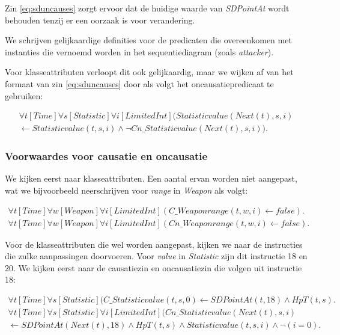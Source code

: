 Zin \ref{eq:sduncauses} zorgt ervoor dat de huidige waarde van \textit{SDPointAt} wordt behouden tenzij er een oorzaak is voor verandering.

We schrijven gelijkaardige definities voor de predicaten die overeenkomen met instanties die vernoemd worden in het sequentiediagram (zoals \textit{attacker}).

\parbreak

Voor klasseattributen verloopt dit ook gelijkaardig, maar we wijken af van het formaat van zin \ref{eq:sduncauses} door als volgt het oncausatiepredicaat te gebruiken:

\begin{align*}
	\forall{t}[Time]\forall{s}[Statistic]\forall{i}[LimitedInt](Statisticvalue(Next(t), s, i) \\ \leftarrow Statisticvalue(t, s, i) \land \lnot Cn\_Statisticvalue(Next(t), s, i)).
\end{align*}

\subsubsection{Voorwaardes voor causatie en oncausatie}
We kijken eerst naar klasseattributen. Een aantal ervan worden niet aangepast, wat we bijvoorbeeld neerschrijven voor \textit{range} in \textit{Weapon} als volgt:

\begin{align*}
	\forall{t}[Time]\forall{w}[Weapon]\forall{i}[LimitedInt](C\_Weaponrange(t, w, i) \leftarrow false).
\end{align*}
\begin{align*}
	\forall{t}[Time]\forall{w}[Weapon]\forall{i}[LimitedInt](Cn\_Weaponrange(t, w, i) \leftarrow false).
\end{align*}

Voor de klasseattributen die wel worden aangepast, kijken we naar de instructies die zulke aanpassingen doorvoeren. Voor \textit{value} in \textit{Statistic} zijn dit instructie 18 en 20. We kijken eerst naar de causatiezin en oncausatiezin die volgen uit instructie 18:

\begin{align*}
	\forall{t}[Time]\forall{s}[Statistic](C\_Statisticvalue(t, s, 0) \leftarrow SDPointAt(t, 18) \land HpT(t, s).
\end{align*}
\begin{align*}
	\forall{t}[Time]\forall{s}[Statistic]\forall{i}[LimitedInt](Cn\_Statisticvalue(Next(t), s, i) \\ \leftarrow SDPointAt(Next(t), 18) \land HpT(t, s) \land Statisticvalue(t, s, i) \land \lnot{}(i = 0).
\end{align*}

